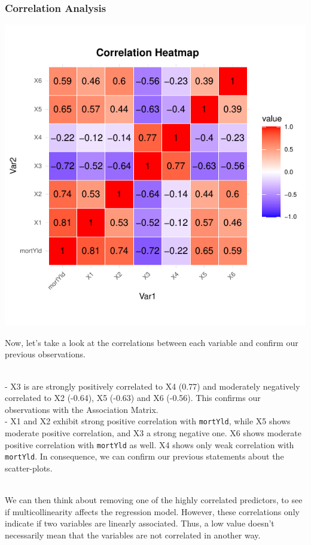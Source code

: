 \documentclass[
  11pt,
]{article}
\begin{document}
\subsubsection{Correlation Analysis}\label{correlation-analysis}

\includegraphics{Figs/unnamed-chunk-7-1.pdf}

Now, let's take a look at the correlations between each variable and
confirm our previous observations.\\
\strut \\
- X3 is are strongly positively correlated to X4 (0.77) and moderately
negatively correlated to X2 (-0.64), X5 (-0.63) and X6 (-0.56). This
confirms our observations with the Association Matrix.\\
- X1 and X2 exhibit strong positive correlation with \texttt{mortYld},
while X5 shows moderate positive correlation, and X3 a strong negative
one. X6 shows moderate positive correlation with \texttt{mortYld} as
well. X4 shows only weak correlation with \texttt{mortYld}. In
consequence, we can confirm our previous statements about the
scatter-plots.\\
\strut \\
We can then think about removing one of the highly correlated
predictors, to see if multicollinearity affects the regression model.
However, these correlations only indicate if two variables are linearly
associated. Thus, a low value doesn't necessarily mean that the
variables are not correlated in another way.
\end{document}
